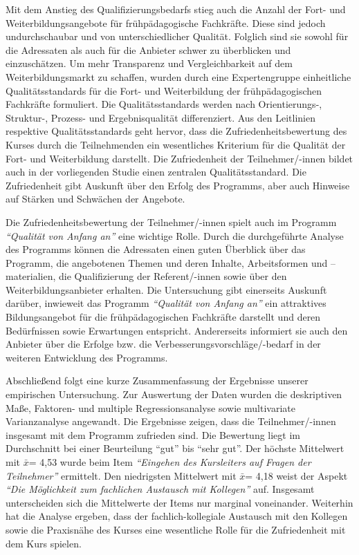 \documentclass[12pt,a4paper]{article}
\begin{document}
Mit dem Anstieg des Qualifizierungsbedarfs stieg auch die Anzahl der Fort- und Weiterbildungsangebote für frühpädagogische Fachkräfte. Diese sind jedoch undurchschaubar und von unterschiedlicher Qualität. Folglich sind sie sowohl für die Adressaten als auch für die Anbieter schwer zu über\-bli\-cken und einzuschätzen. Um mehr Transparenz und Vergleichbarkeit auf dem Weiterbildungsmarkt zu schaffen, wurden durch eine Expertengruppe einheitliche Qualitätsstandards für die Fort- und Weiterbildung der früh\-pä\-da\-gogi\-schen Fachkräfte formuliert. Die Qualitätsstandards werden nach Orientierungs-, Struktur-, Prozess- und Ergebnisqualität differenziert. Aus den Leitlinien respektive Qualitäts\-stan\-dards geht hervor, dass die Zufriedenheitsbewertung des Kurses durch die Teilnehmenden ein wesentliches Kriterium für die Qualität der Fort- und Weiterbildung darstellt. Die Zufriedenheit der Teilnehmer/-innen bildet auch in der vorliegenden Studie einen zentralen Qualitätsstandard. Die Zufriedenheit gibt Auskunft über den Erfolg des Programms, aber auch Hinweise auf Stärken und Schwächen der Angebote.

Die Zufriedenheitsbewertung der Teilnehmer/-innen spielt auch im Programm \textit{"`Qualität von Anfang an"' }eine wichtige Rolle. Durch die durchgeführte Analyse des Programms können die Adressaten einen guten Über\-blick über das Programm, die angebotenen Themen und deren Inhalte, Arbeitsformen und –materialien, die Qualifizierung der Referent/-innen sowie über den Weiterbildungsanbieter erhalten. Die Untersuchung gibt einerseits Auskunft darüber, inwieweit das Programm \textit{"`Qualität von Anfang an"'} ein attraktives Bildungsangebot für die frühpädagogischen Fachkräfte darstellt und deren Bedürfnissen sowie Erwartungen entspricht. Andererseits informiert sie auch den Anbieter über die Erfolge bzw. die Verbesserungsvorschläge/-bedarf in der weiteren Entwicklung des Programms.

Abschließend folgt eine kurze Zusammenfassung der Ergebnisse unserer empirischen Untersuchung. Zur Auswertung der Daten wurden die deskriptiven Maße, Faktoren- und multiple Regressionsanalyse sowie multivariate Varianzanalyse angewandt. Die Ergebnisse zeigen, dass die Teilnehmer/-innen insgesamt mit dem Programm zufrieden sind. Die Bewertung liegt im Durchschnitt bei einer Beurteilung "`gut"' bis "`sehr gut"'. Der höchste Mittelwert mit $\bar x$= 4,53 wurde beim Item\textit{ "`Eingehen des Kursleiters auf Fragen der Teilnehmer"' }ermittelt. Den niedrigsten Mittelwert mit $\bar x$= 4,18 weist der Aspekt \textit{"`Die Möglichkeit zum fachlichen Austausch mit Kollegen"'} auf. Insgesamt unterscheiden sich die Mittelwerte der Items nur marginal voneinander. 
Weiterhin hat die Analyse ergeben, dass der fachlich-kollegiale Austausch mit den Kollegen sowie die Praxisnähe des Kurses eine wesentliche Rolle für die Zufriedenheit mit dem Kurs spielen. 
\end{document}
